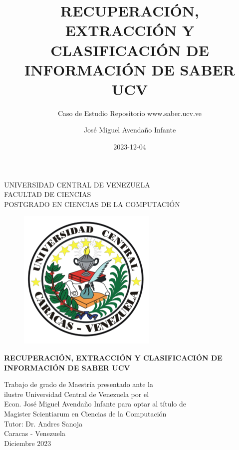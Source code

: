 \documentclass[
  12pt,
  openany]{book}
\title{RECUPERACIÓN, EXTRACCIÓN Y CLASIFICACIÓN DE INFORMACIÓN DE SABER UCV}
\subtitle{Caso de Estudio Repositorio www.saber.ucv.ve}
\author{José Miguel Avendaño Infante}
\date{2023-12-04}
\begin{document}
\maketitle

\thispagestyle{empty}
\begin{center}
	UNIVERSIDAD CENTRAL DE VENEZUELA\\
	FACULTAD DE CIENCIAS\\
	POSTGRADO EN CIENCIAS DE LA COMPUTACI\'ON\\

	\begin{figure}
						\centering
						  \includegraphics[height=.7\textwidth]{images/UCV.png}
  \end{figure}
  \vspace{1.5cm}
  \large{\textbf{RECUPERACI\'ON, EXTRACCI\'ON Y CLASIFICACI\'ON DE \\ INFORMACI\'ON DE SABER UCV}}

  \vspace{3cm}
  Trabajo de grado de Maestría presentado ante la \\
  ilustre Universidad Central de Venezuela por el\\
  Econ. José Miguel Avendaño Infante para  optar
  al título de \\Magister Scientiarum en Ciencias de la Computaci\'on\\
  \vspace{0.5cm}
  Tutor: Dr. Andres Sanoja\\
  \vspace{1.5cm}
  Caracas - Venezuela\\
  Diciembre 2023
\end{center}
\end{document}
